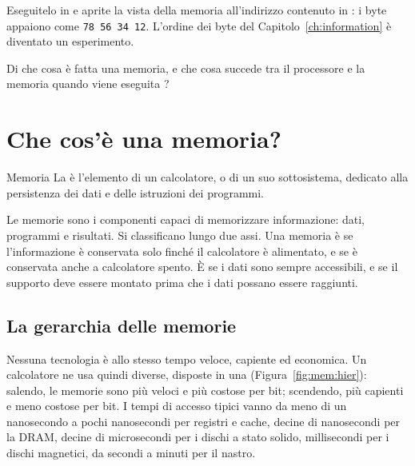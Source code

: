 \begin{prgtry}
Eseguitelo in \prgqt e aprite la vista della memoria all'indirizzo contenuto in
: i byte appaiono come \texttt{78 56 34 12}. L'ordine dei byte del
Capitolo~\ref{ch:information} è diventato un esperimento.
\end{prgtry}

Di che cosa è fatta una memoria, e che cosa succede tra il processore e la
memoria quando viene eseguita ?

\section{Che cos'è una memoria?}

\begin{definition}{Memoria}
La  è l'elemento di un calcolatore, o di un suo sottosistema,
dedicato alla persistenza dei dati e delle istruzioni dei programmi.
\end{definition}

Le memorie sono i componenti capaci di memorizzare informazione: dati,
programmi e risultati. Si classificano lungo due assi. Una memoria è
 se l'informazione è conservata solo finché il calcolatore è
alimentato, e  se è conservata anche a calcolatore spento. È
 se i dati sono sempre accessibili, e  se il
supporto deve essere montato prima che i dati possano essere raggiunti.

\subsection{La gerarchia delle memorie}

Nessuna tecnologia è allo stesso tempo veloce, capiente ed economica. Un
calcolatore ne usa quindi diverse, disposte in una 
(Figura~\ref{fig:mem:hier}): salendo, le memorie sono più veloci e più costose
per bit; scendendo, più capienti e meno costose per bit. I tempi di accesso
tipici vanno da meno di un nanosecondo a pochi nanosecondi per registri e
cache, decine di nanosecondi per la DRAM, decine di microsecondi per i dischi a
stato solido, millisecondi per i dischi magnetici, da secondi a minuti per il
nastro.

